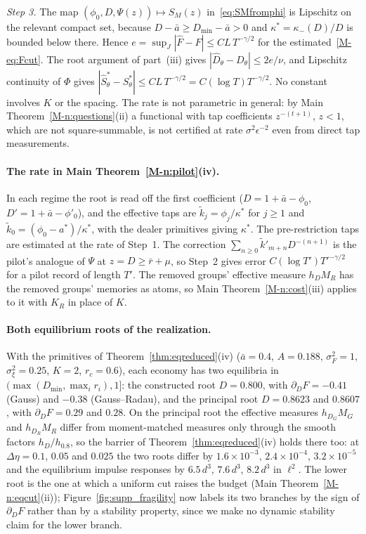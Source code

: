 \documentclass[12pt]{article}
\theoremstyle{definition}
\theoremstyle{remark}
\begin{document}
\emph{Step 3.} The map $(\phi_0, D, \Psi(z)) \mapsto S_M(z)$ in~\eqref{eq:SMfromphi} is Lipschitz on the relevant compact set, because $D - \bar a \ge D_{\min} - \bar a > 0$ and $\kappa^* = \kappa_-(D)/D$ is bounded below there. Hence $e = \sup_J |\hat F - F| \le C L\, T^{-\gamma/2}$ for the estimated~\eqref{M-eq:Fcut}. The root argument of part~(iii) gives $|\hat D_\theta - D_\theta| \le 2e/\nu$, and Lipschitz continuity of $\Phi$ gives $|\hat S^*_\theta - S^*_\theta| \le C L\, T^{-\gamma/2} = C(\log T)T^{-\gamma/2}$. No constant involves $K$ or the spacing. The rate is not parametric in general: by Main Theorem~\ref{M-n:questions}(ii) a functional with tap coefficients $z^{-(t+1)}$, $z < 1$, which are not square-summable, is not certified at rate $\sigma^2\epsilon^{-2}$ even from direct tap measurements.

\paragraph{The rate in Main Theorem~\ref{M-n:pilot}(iv).} In each regime the root is read off the first coefficient ($D = 1 + \bar a - \phi_0$, $D' = 1 + \bar a - \phi'_0$), and the effective taps are $\tilde k_j = \phi_j/\kappa^*$ for $j \ge 1$ and $\tilde k_0 = (\phi_0 - a^*)/\kappa^*$, with the dealer primitives giving $\kappa^*$. The pre-restriction taps are estimated at the rate of Step~1. The correction $\sum_{n \ge 0}\tilde k'_{m+n}D^{-(n+1)}$ is the pilot's analogue of $\Psi$ at $z = D \ge \bar r + \mu$, so Step~2 gives error $C(\log T')T'^{-\gamma/2}$ for a pilot record of length $T'$. The removed groups' effective measure $h_D M_R$ has the removed groups' memories as atoms, so Main Theorem~\ref{M-n:cost}(iii) applies to it with $K_R$ in place of $K$.

\paragraph{Both equilibrium roots of the realization.} With the primitives of Theorem~\ref{thm:eqreduced}(iv) ($\bar a = 0.4$, $A = 0.188$, $\sigma_F^2 = 1$, $\sigma_\xi^2 = 0.25$, $K = 2$, $r_c = 0.6$), each economy has two equilibria in $(\max(D_{\min}, \max_i r_i), 1]$: the constructed root $D = 0.800$, with $\partial_D F = -0.41$ (Gauss) and $-0.38$ (Gauss--Radau), and the principal root $D = 0.8623$ and $0.8607$, with $\partial_D F = 0.29$ and $0.28$. On the principal root the effective measures $h_{D_G}M_G$ and $h_{D_R}M_R$ differ from moment-matched measures only through the smooth factors $h_{D}/h_{0.8}$, so the barrier of Theorem~\ref{thm:eqreduced}(iv) holds there too: at $\Delta\eta = 0.1$, $0.05$ and $0.025$ the two roots differ by $1.6 \times 10^{-3}$, $2.4 \times 10^{-4}$, $3.2 \times 10^{-5}$ and the equilibrium impulse responses by $6.5\,d^3$, $7.6\,d^3$, $8.2\,d^3$ in $\ell^2$. The lower root is the one at which a uniform cut raises the budget (Main Theorem~\ref{M-n:eqcut}(ii)); Figure~\ref{fig:supp_fragility} now labels its two branches by the sign of $\partial_D F$ rather than by a stability property, since we make no dynamic stability claim for the lower branch.
\end{document}
